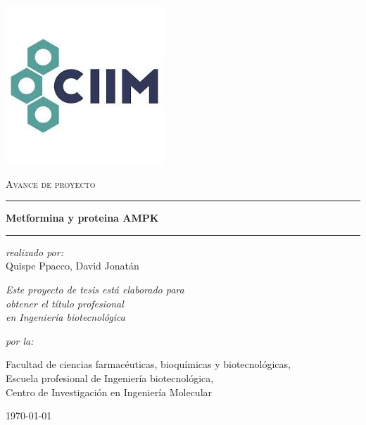 \documentclass[a4paper,11pt,oneside]{book}
\numberwithin{equation}{section}
\begin{document}

\begin{titlepage}
\begin{center}


\includegraphics[scale=0.35]{logo} \vspace{0.5cm}

\textsc{\Large Avance de proyecto } \vspace{0.5cm} %


\rule{14cm}{0.05cm} \vspace{0.4cm} %


\Large{\textbf{Metformina y proteina AMPK }}\vspace{0.4cm} %

\rule{14cm}{0.05cm} \vspace{1.5cm} %
 
\large{\textit{realizado por:}} \\
\Large{Quispe Ppacco, David Jonatán}  %

\vspace{1cm}

\large \textit{
Este proyecto de tesis está elaborado para\\ 
obtener el título profesional\\
en Ingeniería biotecnológica} 

\vspace{2cm} %

\textit{por la:}

\vspace{0.4cm}

Facultad de ciencias farmacéuticas, bioquímicas y biotecnológicas,\\ 
Escuela profesional de Ingeniería biotecnológica,\\ 
Centro de Investigación en Ingeniería Molecular

\vspace{1.0cm} 

\today
 
\end{center}
\end{titlepage}
\end{document}
